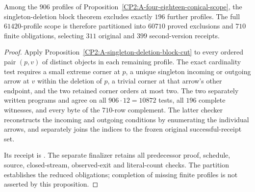 \begin{proposition}
\label{CP2:A-four-eighteen-singleton-deletion-scope}
Among the $906$ profiles of
Proposition~\ref{CP2:A-four-eighteen-conical-scope},
the singleton-deletion block theorem excludes exactly
$196$ further profiles.  The full $61420$-profile
scope is therefore partitioned into $60710$ proved
exclusions and $710$ finite obligations, selecting
$311$ original and $399$ second-version receipts.
\end{proposition}
\begin{proof}
Apply Proposition~\ref{CP2:A-singleton-deletion-block-cut}
to every ordered pair $(p,v)$ of distinct objects in
each remaining profile.  The exact cardinality test
requires a small extreme corner at $p$, a unique
singleton incoming or outgoing arrow at $v$ within
the deletion of $p$, a trivial corner at that arrow's
other endpoint, and the two retained corner orders
at most two.  The two separately written programs
and
agree on all $906\cdot12=10872$ tests, all $196$
complete witnesses, and every byte of the $710$-row
complement.  The latter checker reconstructs the
incoming and outgoing conditions by enumerating the
individual arrows, and separately joins the indices
to the frozen original successful-receipt set.

Its receipt is
.
The separate finalizer
retains all predecessor proof, schedule, source,
closed-stream, observed-exit and literal-count checks.
The partition establishes the reduced obligations;
completion of missing finite profiles is not asserted
by this proposition.
\end{proof}
